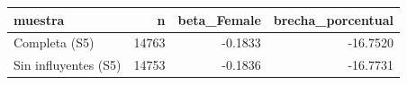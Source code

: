 \begin{tabular}{lrrr}
\toprule
muestra & n & beta\_Female & brecha\_porcentual \\
\midrule
Completa (S5) & 14763 & -0.1833 & -16.7520 \\
Sin influyentes (S5) & 14753 & -0.1836 & -16.7731 \\
\bottomrule
\end{tabular}
